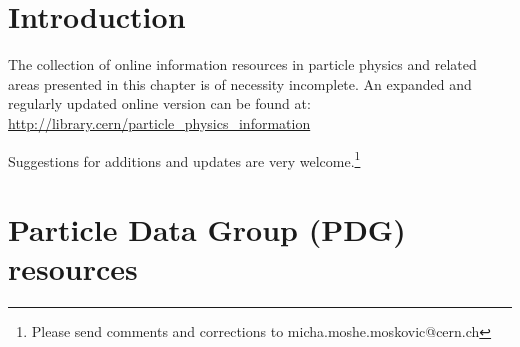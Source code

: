 \section{Introduction}\label{introduction}

The collection of online information resources in particle physics and
related areas presented in this chapter is of necessity incomplete. An
expanded and regularly updated online version can be found at:
\url{http://library.cern/particle_physics_information}

Suggestions for additions and updates are very welcome.\footnote{Please
  send comments and corrections to micha.moshe.moskovic@cern.ch}

\section{Particle Data Group (PDG)
resources}\label{particle-data-group-pdg-resources}

